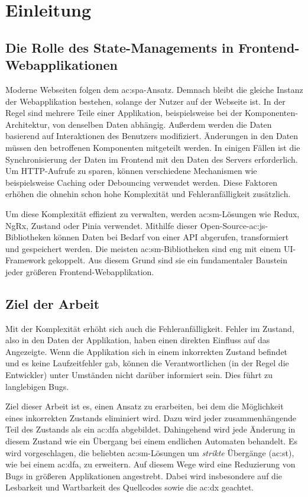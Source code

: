 \chapter{Einleitung}

\section{Die Rolle des State-Managements in Frontend-Webapplikationen}

Moderne Webseiten folgen dem \acrlong{ac:spa}-Ansatz. Demnach bleibt die gleiche Instanz der Webapplikation bestehen, solange der Nutzer auf der Webseite ist. In der Regel sind mehrere Teile einer Applikation, beispielsweise bei der Komponenten-Architektur, von denselben Daten abhängig. Außerdem werden die Daten basierend auf Interaktionen des Benutzers modifiziert. Änderungen in den Daten müssen den betroffenen Komponenten mitgeteilt werden. In einigen Fällen ist die Synchronisierung der Daten im Frontend mit den Daten des Servers erforderlich. Um HTTP-Aufrufe zu sparen, können verschiedene Mechanismen wie beispielsweise Caching oder Debouncing verwendet werden. Diese Faktoren erhöhen die ohnehin schon hohe Komplexität und Fehleranfälligkeit zusätzlich.

Um diese Komplexität effizient zu verwalten, werden \acrlong{ac:sm}-Lösungen wie Redux, NgRx, Zustand oder Pinia verwendet. Mithilfe dieser Open-Source-\acrlong{ac:js}-Bibliotheken können Daten bei Bedarf von einer API abgerufen, transformiert und gespeichert werden. Die meisten \acrlong{ac:sm}-Bibliotheken sind eng mit einem UI-Framework gekoppelt. Aus diesem Grund sind sie ein fundamentaler Baustein jeder größeren Frontend-Webapplikation.

\section{Ziel der Arbeit}

Mit der Komplexität erhöht sich auch die Fehleranfälligkeit. Fehler im Zustand, also in den Daten der Applikation, haben einen direkten Einfluss auf das Angezeigte. Wenn die Applikation sich in einem inkorrekten Zustand befindet und es keine Laufzeitfehler gab, können die Verantwortlichen (in der Regel die Entwickler) unter Umständen nicht darüber informiert sein. Dies führt zu langlebigen Bugs.

Ziel dieser Arbeit ist es, einen Ansatz zu erarbeiten, bei dem die Möglichkeit eines inkorrekten Zustands eliminiert wird. Dazu wird jeder zusammenhängende Teil des Zustands als ein \acrlong{ac:dfa} abgebildet. Dahingehend wird jede Änderung in diesem Zustand wie ein Übergang bei einem endlichen Automaten behandelt. Es wird vorgeschlagen, die beliebten \acrlong{ac:sm}-Lösungen um \textit{strikte} Übergänge (\acrshort{ac:st}), wie bei einem \acrshort{ac:dfa}, zu erweitern. Auf diesem Wege wird eine Reduzierung von Bugs in größeren Applikationen angestrebt. Dabei wird insbesondere auf die Lesbarkeit und Wartbarkeit des Quellcodes sowie die \acrlong{ac:dx} geachtet.

